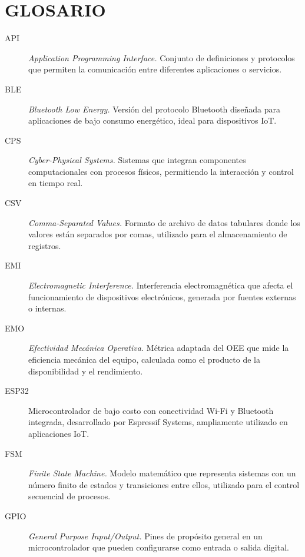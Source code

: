 \clearpage
\chapter*{GLOSARIO}

\begin{description}
  
  \item[API] \textit{Application Programming Interface.} Conjunto de definiciones y protocolos que permiten la comunicación entre diferentes aplicaciones o servicios.
  
  \item[BLE] \textit{Bluetooth Low Energy.} Versión del protocolo Bluetooth diseñada para aplicaciones de bajo consumo energético, ideal para dispositivos IoT.
  
  \item[CPS] \textit{Cyber-Physical Systems.} Sistemas que integran componentes computacionales con procesos físicos, permitiendo la interacción y control en tiempo real.
  
  \item[CSV] \textit{Comma-Separated Values.} Formato de archivo de datos tabulares donde los valores están separados por comas, utilizado para el almacenamiento de registros.
  
  \item[EMI] \textit{Electromagnetic Interference.} Interferencia electromagnética que afecta el funcionamiento de dispositivos electrónicos, generada por fuentes externas o internas.
  
  \item[EMO] \textit{Efectividad Mecánica Operativa.} Métrica adaptada del OEE que mide la eficiencia mecánica del equipo, calculada como el producto de la disponibilidad y el rendimiento.
  
  \item[ESP32] Microcontrolador de bajo costo con conectividad Wi-Fi y Bluetooth integrada, desarrollado por Espressif Systems, ampliamente utilizado en aplicaciones IoT.
  
  \item[FSM] \textit{Finite State Machine.} Modelo matemático que representa sistemas con un número finito de estados y transiciones entre ellos, utilizado para el control secuencial de procesos.
  
  \item[GPIO] \textit{General Purpose Input/Output.} Pines de propósito general en un microcontrolador que pueden configurarse como entrada o salida digital.
  

\end{description}
